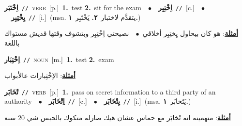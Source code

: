 \documentclass[10pt,a4paper,twoside]{article} %
\begin{document}
\begin{multicols}{2}
{\setlength\topsep{0pt}\textbf{\foreignlanguage{arabic}{اِخْتَبَر}}\ {\color{gray}\texttt{//}\color{black}}\ \textsc{verb}\ [p.]\ \textbf{1.}~test  \textbf{2.}~sit for the exam\ \ $\bullet$\ \ \setlength\topsep{0pt}\textbf{\foreignlanguage{arabic}{اِخْتِبِر}}\ {\color{gray}\texttt{//}\color{black}}\ [c.]\ \ $\bullet$\ \ \setlength\topsep{0pt}\textbf{\foreignlanguage{arabic}{يِخْتِبِر}}\ {\color{gray}\texttt{//}\color{black}}\ [i.]\ \color{gray}(msa. \foreignlanguage{arabic}{يتقدَّم لاختبار}~\foreignlanguage{arabic}{\textbf{٢.}}  \foreignlanguage{arabic}{يَخْتَبِر}~\foreignlanguage{arabic}{\textbf{١.}})\color{black}\  \begin{flushright}\color{gray}\foreignlanguage{arabic}{\textbf{\underline{\foreignlanguage{arabic}{أمثلة}}}: هو كان بيحاول يِختِبِر أخلاقي\ $\bullet$\ \  نصيحتي اِخْتِبِر وبتشوف وقتها قديش مستواك باللغة}\end{flushright}\color{black}} \vspace{2mm}

{\setlength\topsep{0pt}\textbf{\foreignlanguage{arabic}{اِخْتِبَار}}\ {\color{gray}\texttt{//}\color{black}}\ \textsc{noun}\ [m.]\ \textbf{1.}~test  \textbf{2.}~exam\  \begin{flushright}\color{gray}\foreignlanguage{arabic}{\textbf{\underline{\foreignlanguage{arabic}{أمثلة}}}: الاِخْتِبارات عالأبواب}\end{flushright}\color{black}} \vspace{2mm}

{\setlength\topsep{0pt}\textbf{\foreignlanguage{arabic}{تْخَابَر}}\ {\color{gray}\texttt{//}\color{black}}\ \textsc{verb}\ [p.]\ \textbf{1.}~pass on secret information to a third party of an authority\ \ $\bullet$\ \ \setlength\topsep{0pt}\textbf{\foreignlanguage{arabic}{اِتْخَابَر}}\ {\color{gray}\texttt{//}\color{black}}\ [c.]\ \ $\bullet$\ \ \setlength\topsep{0pt}\textbf{\foreignlanguage{arabic}{يِتْخَابَر}}\ {\color{gray}\texttt{//}\color{black}}\ [i.]\ \color{gray}(msa. \foreignlanguage{arabic}{يَتَخابَر}~\foreignlanguage{arabic}{\textbf{١.}})\color{black}\  \begin{flushright}\color{gray}\foreignlanguage{arabic}{\textbf{\underline{\foreignlanguage{arabic}{أمثلة}}}: متهمينه انه تْخابَر مع حماس عشان هيك صارله متكوك بالحبس شي 20 سنة}\end{flushright}\color{black}} \vspace{2mm}


\end{multicols}
\end{document}
